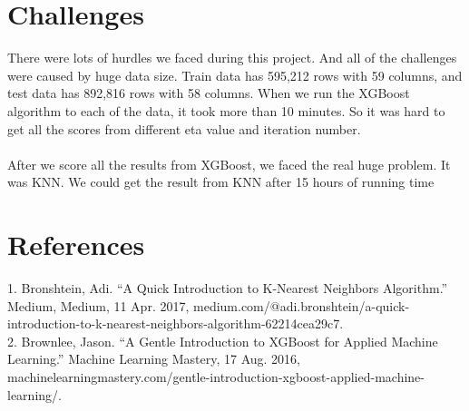 \documentclass[fleqn,10pt]{SelfArx} %
\begin{document}
\bigskip
\bigskip
\section{Challenges}

\hspace{\parindent} There were lots of hurdles we faced during this project. And all of the challenges were caused by huge data size. Train data has 595,212 rows with 59 columns, and test data has 892,816 rows with 58 columns. When we run the XGBoost algorithm to each of the data, it took more than 10 minutes. So it was hard to get all the scores from different eta value and iteration number. \\ \\
After we score all the results from XGBoost, we faced the real huge problem. It was KNN. We could get the result from KNN after 15 hours of running time

\bigskip
\bigskip
\bigskip



\section*{References} %





\hspace{\parindent} 1. Bronshtein, Adi. “A Quick Introduction to K-Nearest Neighbors Algorithm.” Medium, Medium, 11 Apr. 2017, medium.com/@adi.bronshtein/a-quick-introduction-to-k-nearest-neighbors-algorithm-62214cea29c7. \\

 2. Brownlee, Jason. “A Gentle Introduction to XGBoost for Applied Machine Learning.” Machine Learning Mastery, 17 Aug. 2016, machinelearningmastery.com/gentle-introduction-xgboost-applied-machine-learning/.




\end{document}
